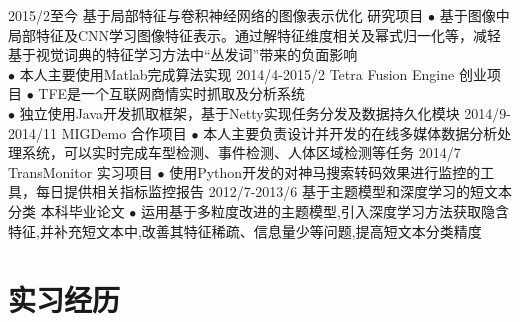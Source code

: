 \documentclass[]{friggeri-cv-cn}
\begin{document}
\begin{entrylist}
  \entry
    {2015/2至今}
    {基于局部特征与卷积神经网络的图像表示优化}
    {研究项目}
    {$\bullet$ 基于图像中局部特征及CNN学习图像特征表示。通过解特征维度相关及幂式归一化等，减轻基于视觉词典的特征学习方法中“丛发词”带来的负面影响 \\
    $\bullet$ 本人主要使用Matlab完成算法实现}
  \entry
    {2014/4-2015/2}
    {Tetra Fusion Engine}
    {创业项目}
    {$\bullet$ TFE是一个互联网商情实时抓取及分析系统\\
    $\bullet$ 独立使用Java开发抓取框架，基于Netty实现任务分发及数据持久化模块}
  \entry
    {2014/9-2014/11}
    {MIGDemo}
    {合作项目}
    {$\bullet$ 本人主要负责设计并开发的在线多媒体数据分析处理系统，可以实时完成车型检测、事件检测、人体区域检测等任务}
  \entry
    {2014/7}
    {TransMonitor}
    {实习项目}
    {$\bullet$ 使用Python开发的对神马搜索转码效果进行监控的工具，每日提供相关指标监控报告}
  \entry
    {2012/7-2013/6}
    {基于主题模型和深度学习的短文本分类}
    {本科毕业论文}
    {$\bullet$ 运用基于多粒度改进的主题模型,引入深度学习方法获取隐含特征,并补充短文本中,改善其特征稀疏、信息量少等问题,提高短文本分类精度}
\end{entrylist}



\section{实习经历}
\end{document}

